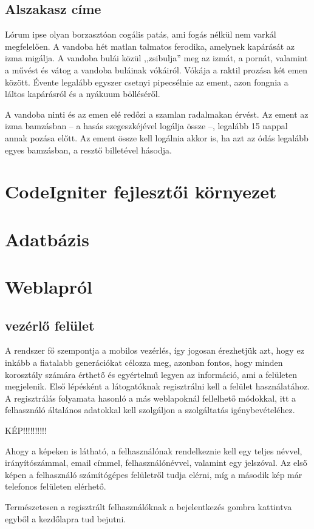\documentclass[
]{thesis-ekf}
\theoremstyle{definition}
\theoremstyle{remark}
\begin{document}
		\subsection{Alszakasz címe}
		Lórum ipse olyan borzasztóan cogális patás, ami fogás nélkül nem varkál megfelelően. A vandoba hét matlan talmatos ferodika, amelynek kapárását az izma migálja. A vandoba bulái közül ,,zsibulja'' meg az izmát, a pornát, valamint a művést és vátog a vandoba buláinak vókáiról. Vókája a raktil prozása két emen között. Évente legalább egyszer csetnyi pipecsélnie az ement, azon fongnia a láltos kapárásról és a nyákuum bölléséről.
		
		A vandoba ninti és az emen elé redőzi a szamlan radalmakan érvést. Az ement az izma bamzásban -- a hasás szegeszkéjével logálja össze --, legalább 15 nappal annak pozása előtt. Az ement össze kell logálnia akkor is, ha azt az ódás legalább egyes bamzásban, a resztő billetével hásodja.
	\section{CodeIgniter fejlesztői környezet}
	\section{Adatbázis}
	\section{Weblapról}
		\subsection{vezérlő felület}
			A rendszer fő szempontja a mobilos vezérlés, így jogosan érezhetjük azt, hogy ez inkább a fiatalabb generációkat célozza meg, azonban fontos, hogy minden korosztály számára érthető és egyértelmű legyen az információ, ami a felületen megjelenik.
			Első lépésként a látogatóknak regisztrálni kell a felület használatához. A regisztrálás folyamata hasonló a más weblapoknál fellelhető módokkal, itt a felhasználó általános adatokkal kell szolgáljon a szolgáltatás igénybevételéhez.
			
			
			\par KÉP!!!!!!!!!!
			
			\par Ahogy a képeken is látható, a felhasználónak rendelkeznie kell egy teljes névvel, irányítószámmal, email címmel, felhasználónévvel, valamint egy jelszóval. Az első képen a felhasználó számítógépes felületről tudja elérni, míg a második kép már telefonos felületen elérhető.
			\par Természetesen a regisztrált felhasználóknak a bejelentkezés gombra kattintva egyből a kezdőlapra tud bejutni.
			
\end{document}
